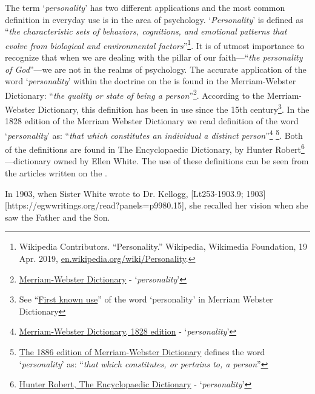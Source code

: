 The term ‘\textit{personality}’ has two different applications and the most common definition in everyday use is in the area of psychology. ‘\textit{Personality}’ is defined as “\textit{the characteristic sets of behaviors, cognitions, and emotional patterns that evolve from biological and environmental factors}”\footnote{Wikipedia Contributors. “Personality.” Wikipedia, Wikimedia Foundation, 19 Apr. 2019, \href{https://en.wikipedia.org/wiki/Personality}{en.wikipedia.org/wiki/Personality}.}. It is of utmost importance to recognize that when we are dealing with the pillar of our faith—“\textit{the personality of God}”—we are not in the realms of psychology. The accurate application of the word ‘\textit{personality}’ within the doctrine on the  is found in the Merriam-Webster Dictionary: “\textit{the quality or state of being a person}”\footnote{\href{https://www.merriam-webster.com/dictionary/personality}{Merriam-Webster Dictionary} - ‘\textit{personality}’}. According to the Merriam-Webster Dictionary, this definition has been in use since the 15th century\footnote{See “\href{https://www.merriam-webster.com/dictionary/personality\#word-history}{First known use}” of the word ‘personality’ in Merriam Webster Dictionary}. In the 1828 edition of the Merriam Webster Dictionary we read definition of the word ‘\textit{personality}’ as: “\textit{that which constitutes an individual a distinct person}”\footnote{\href{https://archive.org/details/americandictiona02websrich/page/272/mode/2up}{Merriam-Webster Dictionary, 1828 edition} - ‘\textit{personality}’} \footnote{\href{https://archive.org/details/websterscomplete00webs/page/974/mode/2up}{The 1886 edition of Merriam-Webster Dictionary} defines the word ‘\textit{personality}’ as: “\textit{that which constitutes, or pertains to, a person}”}. Both of the definitions are found in The Encyclopaedic Dictionary, by Hunter Robert\footnote{\href{https://babel.hathitrust.org/cgi/pt?id=mdp.39015050663213&view=1up&seq=780}{Hunter Robert, The Encyclopaedic Dictionary} - ‘\textit{personality}’}—dictionary owned by Ellen White. The use of these definitions can be seen from the articles written on the .

In 1903, when Sister White wrote to Dr. Kellogg, [Lt253-1903.9; 1903][https://egwwritings.org/read?panels=p9980.15], she recalled her vision when she saw the Father and the Son.

